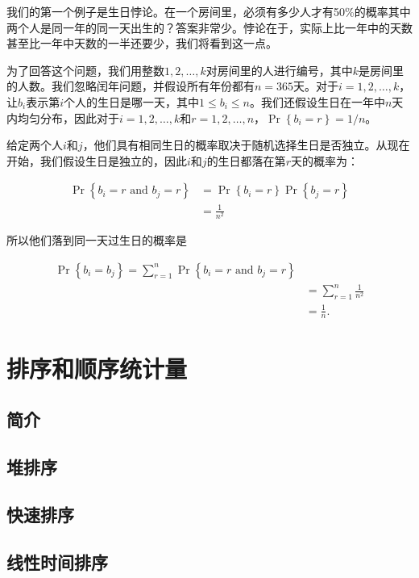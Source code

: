 \documentclass[lang=cn,newtx,10pt,scheme=chinese]{elegantbook}
\begin{document}
我们的第一个例子是生日悖论。在一个房间里，必须有多少人才有50\%的概率其中两个人是同一年的同一天出生的？答案非常少。悖论在于，实际上比一年中的天数甚至比一年中天数的一半还要少，我们将看到这一点。

为了回答这个问题，我们用整数$1,2,\ldots,k$对房间里的人进行编号，其中$k$是房间里的人数。我们忽略闰年问题，并假设所有年份都有$n=365$天。对于$i=1,2,\ldots,k$，让$b_i$表示第$i$个人的生日是哪一天，其中$1\leq b_i\leq n$。我们还假设生日在一年中$n$天内均匀分布，因此对于$i=1,2,\ldots,k$和$r=1,2,\ldots,n$，$\operatorname{Pr}\left\{b_i=r\right\}=1/n$。

给定两个人$i$和$j$，他们具有相同生日的概率取决于随机选择生日是否独立。从现在开始，我们假设生日是独立的，因此$i$和$j$的生日都落在第$r$天的概率为：

$$
\begin{aligned}
\operatorname{Pr}\left\{b_i=r \text { and } b_j=r\right\} & =\operatorname{Pr}\left\{b_i=r\right\} \operatorname{Pr}\left\{b_j=r\right\} \\
& =\frac{1}{n^2}
\end{aligned}
$$

所以他们落到同一天过生日的概率是

$$
\begin{aligned}
\operatorname{Pr}\left\{b_i=b_j\right\}=\sum_{r=1}^n \operatorname{Pr}\left\{b_i=r \text { and } b_j=r\right\} \\
& =\sum_{r=1}^n \frac{1}{n^2} \\
& =\frac{1}{n} .
\end{aligned}
$$



\part{排序和顺序统计量}

\chapter*{简介}

\chapter{堆排序}

\chapter{快速排序}

\chapter{线性时间排序}
\end{document}
